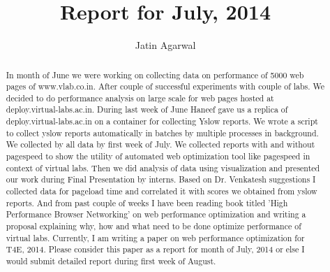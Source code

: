\documentclass[a4paper,10pt]{report}
\title{Report for July, 2014}
\author{Jatin Agarwal}
\begin{document}
\maketitle
\begin{abstract}
In month of June we were working on collecting data on performance of 5000 web pages of www.vlab.co.in. After couple of successful experiments
with couple of labs. We decided to do performance analysis on large scale for web pages hosted at deploy.virtual-labs.ac.in.
During last week of June Haneef gave us a replica of deploy.virtual-labs.ac.in
on a container for collecting Yslow reports. We wrote a script to collect yslow reports automatically in batches by multiple processes in
background. We collected by all data by first week of July. We collected reports with and without pagespeed to show the utility of
automated web optimization tool like pagespeed in context of virtual labs.  
Then we did analysis of data using visualization and presented our
work during Final Presentation by interns. Based on Dr. Venkatesh suggestions I collected data for pageload time
and correlated it with scores we obtained from yslow reports.  And from past couple of weeks I have been reading book titled
'High Performance Browser Networking' on web performance optimization
and writing a proposal explaining why, how and what need to be done optimize performance of virtual labs. Currently, I am writing a paper on
web performance optimization for T4E, 2014. Please consider this paper as a report for month of July, 2014 or else I would submit detailed report
during first week of August.
\end{abstract}
\end{document}
